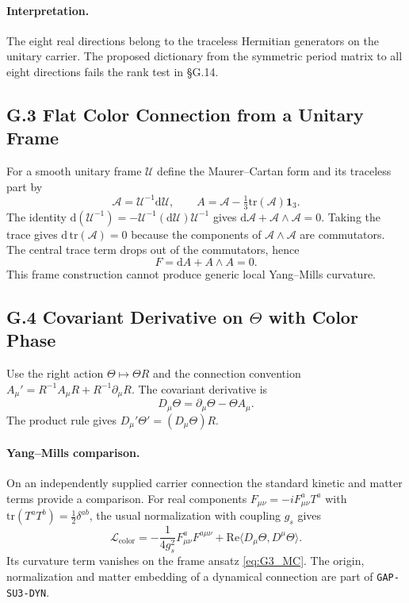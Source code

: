 \paragraph{Interpretation.}
The eight real directions belong to the traceless Hermitian generators
on the unitary carrier. The proposed dictionary from the symmetric period
matrix to all eight directions fails the rank test in \S G.14.

\subsection*{G.3 Flat Color Connection from a Unitary Frame}
For a smooth unitary frame $\mathcal U$ define the Maurer--Cartan form and
its traceless part by
\begin{equation}
\label{eq:G3_MC}
\mathcal A=\mathcal U^{-1}\mathrm d\mathcal U,\qquad
A=\mathcal A-\tfrac13\mathrm{tr}(\mathcal A)\mathbf1_3.
\end{equation}
The identity $\mathrm d(\mathcal U^{-1})=-\mathcal U^{-1}(\mathrm d\mathcal U)
\mathcal U^{-1}$ gives $\mathrm d\mathcal A+\mathcal A\wedge\mathcal A=0$.
Taking the trace gives $\mathrm d\,\mathrm{tr}(\mathcal A)=0$ because the
components of $\mathcal A\wedge\mathcal A$ are commutators. The central
trace term drops out of the commutators, hence
\begin{equation}
\label{eq:G3_curvature}
F=\mathrm dA+A\wedge A=0.
\end{equation}
This frame construction cannot produce generic local Yang--Mills curvature.

\subsection*{G.4 Covariant Derivative on \texorpdfstring{$\Theta$}{Theta} with Color Phase}
Use the right action $\Theta\mapsto\Theta R$ and the connection convention
$A_\mu'=R^{-1}A_\mu R+R^{-1}\partial_\mu R$. The covariant derivative is
\begin{equation}
\label{eq:G4_covD}
D_\mu\Theta=\partial_\mu\Theta-\Theta A_\mu.
\end{equation}
The product rule gives $D_\mu'\Theta'=(D_\mu\Theta)R$.

\paragraph{Yang--Mills comparison.}
On an independently supplied carrier connection the standard kinetic and
matter terms provide a comparison. For real components
$F_{\mu\nu}=-i F_{\mu\nu}^a T^a$ with $\mathrm{tr}(T^aT^b)=\tfrac12\delta^{ab}$,
the usual normalization with coupling $g_s$ gives
\begin{equation}
\label{eq:G4_lagrangian}
\mathcal L_{\mathrm{color}}=
-\frac{1}{4g_s^2}F_{\mu\nu}^aF^{a\mu\nu}
+\mathrm{Re}\langle D_\mu\Theta,D^\mu\Theta\rangle.
\end{equation}
Its curvature term vanishes on the frame ansatz \eqref{eq:G3_MC}.
The origin, normalization and matter embedding of a dynamical connection
are part of \texttt{GAP-SU3-DYN}.


